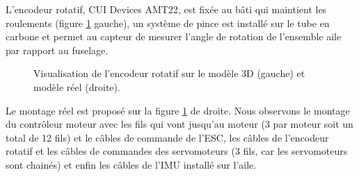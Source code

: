 {    L'encodeur rotatif, CUI Devices AMT22, est fixée au bâti qui maintient les roulements (figure \ref{fig:ColibriRotReel} gauche), un système de pince est installé sur le tube en carbone et permet au capteur de mesurer l'angle de rotation de l'ensemble aile par rapport au fuselage.

    \begin{figure}[ht!]
        \centering
        \caption{Visualisation de l'encodeur rotatif sur le modèle 3D (gauche) et modèle réel (droite).}
        \label{fig:ColibriRotReel}
    \end{figure}
    Le montage réel est proposé sur la figure \ref{fig:ColibriRotReel} de droite. Nous observons le montage du contrôleur moteur avec les fils qui vont jusqu'au moteur (3 par moteur soit un total de 12 fils) et le câbles de commande de l'ESC, les câbles de l'encodeur rotatif et les câbles de commandes des servomoteurs (3 fils, car les servomoteurs sont chainés) et enfin les câbles de l'IMU installé sur l'aile.
}

